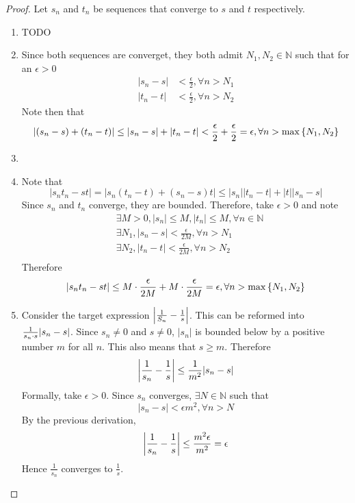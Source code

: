 \documentclass[../notes.tex]{subfiles}
\begin{document}
\begin{proof}
	Let $s_n$ and $t_n$ be sequences that converge to $s$ and $t$ respectively.
	\begin{enumerate}[label=\alph*)]
		\item TODO
		\item 
            Since both sequences are converget, they both admit $N_1, N_2 \in \mathbb{N}$ such that for an $\epsilon > 0$
            \begin{align*}
            |s_n - s| &< \frac{\epsilon}{2}, \forall n > N_1 \\
            |t_n - t| &< \frac{\epsilon}{2}, \forall n > N_2
            \end{align*}
            Note then that 
            \[
            |(s_n - s) + (t_n - t)| \leq |s_n - s| + |t_n - t| < \frac{\epsilon}{2} + \frac{\epsilon}{2} = \epsilon, \forall n > \max\qty{N_1, N_2}
            \]
        \item
        \item
            Note that
            \[
                |s_n t_n - st| = |s_n(t_n - t) + (s_n - s)t| \leq |s_n| |t_n - t| + |t| |s_n - s|
            \]
            Since $s_n$ and $t_n$ converge, they are bounded. Therefore, take $\epsilon > 0$ and note
            \begin{align*}
                &\exists M > 0, |s_n| \leq M, |t_n| \leq M, \forall n \in \mathbb{N} \\
                &\exists N_1, |s_n - s| < \frac{\epsilon}{2M}, \forall n > N_1 \\
                &\exists N_2, |t_n - t| < \frac{\epsilon}{2M}, \forall n > N_2 \\
            \end{align*}
            Therefore 
            \[
                |s_n t_n - st| \leq M \cdot \frac{\epsilon}{2M} + M \cdot \frac{\epsilon}{2M} = \epsilon, \forall n > \max\qty{N_1, N_2}
            \]
        \item
            Consider the target expression $\qty|\frac{1}{S_n} - \frac{1}{s}|$. This can be reformed into $\frac{1}{s_n \cdot s} \qty|s_n - s|$. Since $s_n \neq 0$ and $s \neq 0$, $|s_n|$ is bounded below by a positive number $m$ for all $n$. This also means that $s \geq m$. Therefore
            \[
                \qty|\frac{1}{s_n} - \frac{1}{s}| \leq \frac{1}{m^2} |s_n - s|
            \]
            Formally, take $\epsilon > 0$. Since $s_n$ converges, $\exists N \in \mathbb{N}$ such that
            \[
                |s_n - s| < \epsilon m^2, \forall n > N
            \]
            By the previous derivation,
            \[
                \qty|\frac{1}{s_n} - \frac{1}{s}| \leq \frac{m^2 \epsilon}{m^2} = \epsilon
            \]
            Hence $\frac{1}{s_n}$ converges to $\frac{1}{s}$.
	\end{enumerate}
\end{proof}
\end{document}
